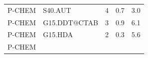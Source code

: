 \documentclass[utf8]{frontiersHLTH} %
\begin{document}
\begin{longtable}[]{@{}lllll@{}}
\begin{minipage}[t]{0.26\columnwidth}
P-CHEM\strut
\end{minipage} & \begin{minipage}[t]{0.21\columnwidth}\raggedright\strut
S40.AUT\strut
\end{minipage} & \begin{minipage}[t]{0.06\columnwidth}\raggedright\strut
4\strut
\end{minipage} & \begin{minipage}[t]{0.15\columnwidth}\raggedright\strut
0.7\strut
\end{minipage} & \begin{minipage}[t]{0.08\columnwidth}\raggedright\strut
3.0\strut
\end{minipage}\tabularnewline
\begin{minipage}[t]{0.26\columnwidth}\raggedright\strut
P-CHEM\strut
\end{minipage} & \begin{minipage}[t]{0.21\columnwidth}\raggedright\strut
G15.DDT@CTAB\strut
\end{minipage} & \begin{minipage}[t]{0.06\columnwidth}\raggedright\strut
3\strut
\end{minipage} & \begin{minipage}[t]{0.15\columnwidth}\raggedright\strut
0.9\strut
\end{minipage} & \begin{minipage}[t]{0.08\columnwidth}\raggedright\strut
6.1\strut
\end{minipage}\tabularnewline
\begin{minipage}[t]{0.26\columnwidth}\raggedright\strut
P-CHEM\strut
\end{minipage} & \begin{minipage}[t]{0.21\columnwidth}\raggedright\strut
G15.HDA\strut
\end{minipage} & \begin{minipage}[t]{0.06\columnwidth}\raggedright\strut
2\strut
\end{minipage} & \begin{minipage}[t]{0.15\columnwidth}\raggedright\strut
0.3\strut
\end{minipage} & \begin{minipage}[t]{0.08\columnwidth}\raggedright\strut
5.6\strut
\end{minipage}\tabularnewline
\begin{minipage}[t]{0.26\columnwidth}\raggedright\strut
P-CHEM\strut
\end{minipage} & \begin{minipage}[t]{0.21\columnwidth}\raggedright\strut

\end{minipage}
\end{longtable}
\end{document}
